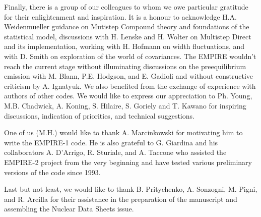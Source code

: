 Finally, there is a group of our colleagues to whom we owe particular
gratitude for their enlightenment and inspiration. It is a honour to
acknowledge H.A. Weidenmueller guidance on Mutistep Compound theory and
foundations of the statistical model, discussions with H. Lenske and H.
Wolter on Multistep Direct and its implementation, working with H. Hofmann
on width fluctuations, and with D. Smith on exploration of the world of
covariances. The EMPIRE wouldn't reach the current stage without
illuminating discussions on the preequilibrium emission with M. Blann, P.E.
Hodgson, and E. Gadioli and without constructive criticism by A. Ignatyuk.
We also benefited from the exchange of experience with authors of other
codes. We would like to express our appreciation to Ph. Young, M.B.
Chadwick, A. Koning, S. Hilaire, S. Goriely and T. Kawano for inspiring
discussions, indication of priorities, and technical suggestions.

One of us (M.H.) would like to thank A. Marcinkowski for motivating him to
write the EMPIRE-1 code. He is also grateful to G. Giardina and his
collaborators A. D'Arrigo, R. Sturiale, and A. Taccone who assisted the
EMPIRE-2 project from the very beginning and have tested various preliminary
versions of the code since 1993.

Last but not least, we would like to thank B. Pritychenko, A. Sonzogni, M.
Pigni, and R. Arcilla for their assistance in the preparation of the
manuscript and assembling the Nuclear Data Sheets issue.

% 



